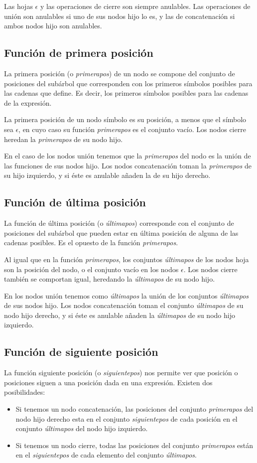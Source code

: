 Las hojas $ \epsilon $ y las operaciones de cierre son siempre anulables.
Las operaciones de unión son anulables si uno de sus nodos hijo lo es, y las de concatenación si ambos nodos hijo son anulables.

\subsection{Función de primera posición}
La primera posición (o \emph{primerapos}) de un nodo se compone del conjunto de posiciones del subárbol que corresponden con los primeros símbolos posibles para las cadenas que define.
Es decir, los primeros símbolos posibles para las cadenas de la expresión.

La primera posición de un nodo símbolo es su posición, a menos que el símbolo sea $ \epsilon $, en cuyo caso su función \emph{primerapos} es el conjunto vacío.
Los nodos cierre heredan la \emph{primerapos} de su nodo hijo.

En el caso de los nodos unión tenemos que la \emph{primerapos} del nodo es la unión de las funciones de sus nodos hijo.
Los nodos concatenación toman la \emph{primerapos} de su hijo izquierdo, y si éste es anulable añaden la de su hijo derecho.

\subsection{Función de última posición}
La función de última posición (o \emph{últimapos}) corresponde con el conjunto de posiciones del subárbol que pueden estar en última posición de alguna de las cadenas posibles.
Es el opuesto de la función \emph{primerapos}.

Al igual que en la función \emph{primerapos}, los conjuntos \emph{últimapos} de los nodos hoja son la posición del nodo, o el conjunto vacío en los nodos $ \epsilon $.
Los nodos cierre también se comportan igual, heredando la \emph{últimapos} de su nodo hijo.

En los nodos unión tenemos como \emph{últimapos} la unión de los conjuntos \emph{últimapos} de sus nodos hijo.
Los nodos concatenación toman el conjunto \emph{últimapos} de su nodo hijo derecho, y si éste es anulable añaden la \emph{últimapos} de su nodo hijo izquierdo.

\subsection{Función de siguiente posición}
La función siguiente posición (o \emph{siguientepos}) nos permite ver que posición o posiciones siguen a una posición dada en una expresión.
Existen dos posibilidades:
\begin{itemize}
	\item Si tenemos un nodo concatenación, las posiciones del conjunto \emph{primerapos} del nodo hijo derecho esta en el conjunto \emph{siguientepos} de cada posición en el conjunto \emph{últimapos} del nodo hijo izquierdo.
	\item Si tenemos un nodo cierre, todas las posiciones del conjunto \emph{primerapos} están en el \emph{siguientepos} de cada elemento del conjunto \emph{últimapos}.
\end{itemize}


